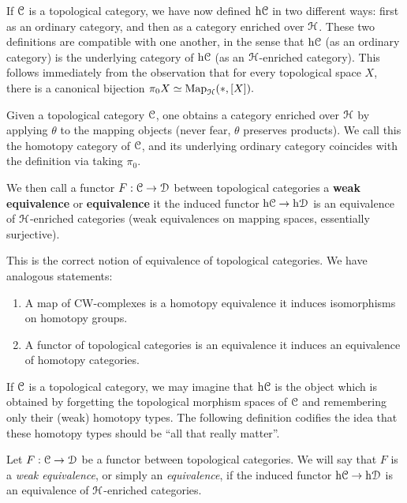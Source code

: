 \begin{remark}
If $\operatorname{\mathcal{C}}$ is a topological category, we have now defined $\rm{h} \it{\operatorname{\mathcal{C}}}$ in two different ways: first as an ordinary category, and then as a category enriched over $\operatorname{\mathcal{H}}$. These two definitions are compatible with one another, in the sense that $\rm{h} \it{\operatorname{\mathcal{C}}}$ (as an ordinary category) is the
underlying category of $\rm{h} \it{\operatorname{\mathcal{C}}}$ (as an $\operatorname{\mathcal{H}}$-enriched category). This follows immediately
from the observation that for every topological space $X$, there is a canonical bijection
$\pi_0 X \simeq \operatorname{{Map}}_{\operatorname{\mathcal{H}}}( \ast, [X] ).$
\end{remark}
\begin{shaded}
Given a topological category $\operatorname{\mathcal{C}}$, one obtains a category enriched over $\operatorname{\mathcal{H}}$ by applying $\theta$ to the mapping objects (never fear, $\theta$ preserves products). We call this the homotopy category of $\operatorname{\mathcal{C}}$, and its underlying ordinary category coincides with the definition via taking $\pi_0$.

We then call a functor $F: \operatorname{\mathcal{C}} \rightarrow \operatorname{\mathcal{D}}$ between topological categories a \textbf{weak equivalence} or \textbf{equivalence} it the induced functor $\rm{h} \it{ \operatorname{\mathcal{C}}} \rightarrow \rm{h} \it{ \operatorname{\mathcal{D}}}$ is an equivalence of $\operatorname{\mathcal{H}}$-enriched categories (weak equivalences on mapping spaces, essentially surjective).

This is the correct notion of equivalence of topological categories. We have analogous statements:
\begin{enumerate}\squishlist
\item A map of CW-complexes is a homotopy equivalence \Iff it induces isomorphisms on homotopy groups.
\item A functor of topological categories is an equivalence \Iff it induces an equivalence of homotopy categories.
\end{enumerate}


\end{shaded}


If $\operatorname{\mathcal{C}}$ is a topological category, we may imagine that $\rm{h} \it{\operatorname{\mathcal{C}}}$ is the object which is obtained by forgetting the topological morphism spaces of $\operatorname{\mathcal{C}}$ and remembering only their (weak) homotopy types. The following definition codifies the idea that these homotopy types should be ``all that really matter''.

\begin{definition}\label{defequiv}
Let $F: \operatorname{\mathcal{C}} \rightarrow \operatorname{\mathcal{D}}$ be a functor between topological categories. We will say that $F$ is a {\it weak equivalence}, or simply an {\it equivalence}, if the induced functor
$\rm{h} \it{ \operatorname{\mathcal{C}}} \rightarrow \rm{h} \it{ \operatorname{\mathcal{D}}}$ is an equivalence of $\operatorname{\mathcal{H}}$-enriched categories.
\end{definition}

